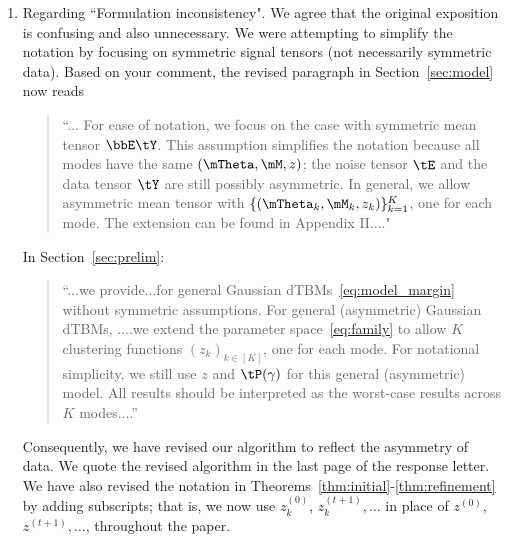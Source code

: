 \documentclass[11pt]{article}
\theoremstyle{definition}
\newtheorem{thm}{Theorem}
\theoremstyle{definition}
\begin{document}
\begin{enumerate}[wide, labelwidth=!, labelindent=0pt]
\begin{enumerate}
\item Regarding ``Formulation inconsistency". We agree that the original exposition is confusing and also unnecessary. We were attempting to simplify the notation by focusing on symmetric signal tensors (not necessarily symmetric data). Based on your comment, the revised paragraph in Section~\ref{sec:model} now reads

\begin{quote}
    ``... For ease of notation, we focus on the case with symmetric mean tensor $\bbE \tY$. This assumption simplifies the notation because all modes have the same $(\mTheta, \mM, z)$; the noise tensor $\tE$ and the data tensor $\tY$ are still possibly asymmetric. In general, we allow asymmetric mean tensor with $\{(\mTheta_k, \mM_k, z_k)\}_{k=1}^K$, one for each mode. The extension can be found in Appendix II...."
\end{quote}

In Section~\ref{sec:prelim}:
\begin{quote}
``...we provide...for general Gaussian dTBMs~\eqref{eq:model_margin} without symmetric assumptions. For general (asymmetric) Gaussian dTBMs, ....we extend the parameter space~\eqref{eq:family} to allow $K$ clustering functions $(z_k)_{k\in[K]}$, one for each mode. For notational simplicity, we still use $z$ and $\tP(\gamma)$ for this general (asymmetric) model. All results should be interpreted as the worst-case results across $K$ modes....''
\end{quote}

Consequently, we have revised our algorithm to reflect the asymmetry of data. We quote the revised algorithm in the last page of the response letter. We have also revised the notation in Theorems~\ref{thm:initial}-\ref{thm:refinement} by adding subscripts; that is, we now use $z_k^{(0)}$, $z_k^{(t+1)},\ldots$ in place of $z^{(0)}$, $z^{(t+1)}, \ldots$, throughout the paper.  




\end{enumerate}
\end{enumerate}
\end{document}
